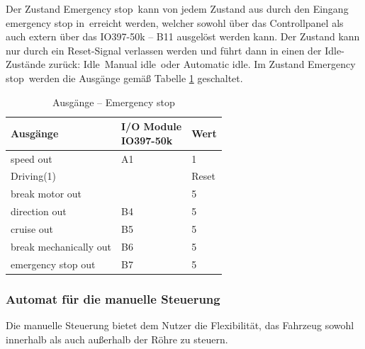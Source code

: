 Der Zustand \frqq Emergency stop\flqq\ kann von jedem Zustand aus durch den Eingang \frqq emergency stop in\flqq\ erreicht werden, welcher sowohl über das Controllpanel als auch extern über das IO397-50k – B11 ausgelöst werden kann. Der Zustand kann nur durch ein Reset-Signal verlassen werden und führt dann in einen der Idle-Zustände zurück: \frqq Idle\flqq\ \frqq Manual idle\flqq\ oder \frqq Automatic idle\flqq. Im Zustand \frqq Emergency stop\flqq\ werden die Ausgänge gemäß Tabelle \ref{Automat_man:tab:z_Emergency_stop} geschaltet.


\pagebreak[1]
\begin{table}[!ht]
	\centering
	\caption{Ausgänge – Emergency stop}
	\label{Automat_man:tab:z_Emergency_stop}
	\begin{tabular}{lll}
		\hline
		\textbf{Ausgänge}                           & \makecell{\textbf{I/O Module}         \\ \textbf{IO397-50k}}                 & \textbf{Wert} \\ \hline
		\multicolumn{1}{l|}{speed out}              & \multicolumn{1}{l|}{A1}       & 1     \\
		\multicolumn{1}{l|}{Driving(1)}             & \multicolumn{1}{l|}{}         & Reset \\
		\multicolumn{1}{l|}{break motor out}        & \multicolumn{1}{l|}{}         & 5     \\
		\multicolumn{1}{l|}{direction out}          & \multicolumn{1}{l|}{B4}       & 5     \\
		\multicolumn{1}{l|}{cruise out}             & \multicolumn{1}{l|}{B5}       & 5     \\
		\multicolumn{1}{l|}{break mechanically out} & \multicolumn{1}{l|}{B6}       & 5     \\
		\multicolumn{1}{l|}{emergency stop out}     & \multicolumn{1}{l|}{B7}       & 5     \\ \hline
	\end{tabular}
\end{table}
\pagebreak[1]










\subsubsection{Automat für die manuelle Steuerung}
\label{Automatensteuerung:Automat_man}

Die manuelle Steuerung bietet dem Nutzer die Flexibilität, das Fahrzeug sowohl innerhalb als auch außerhalb der Röhre zu steuern.\\

